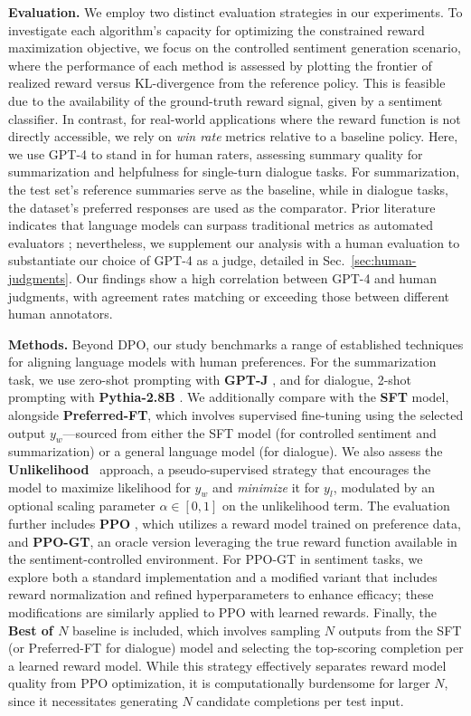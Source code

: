 \textbf{Evaluation.} We employ two distinct evaluation strategies in our experiments. To investigate each algorithm’s capacity for optimizing the constrained reward maximization objective, we focus on the controlled sentiment generation scenario, where the performance of each method is assessed by plotting the frontier of realized reward versus KL-divergence from the reference policy. This is feasible due to the availability of the ground-truth reward signal, given by a sentiment classifier. In contrast, for real-world applications where the reward function is not directly accessible, we rely on \textit{win rate} metrics relative to a baseline policy. Here, we use GPT-4 to stand in for human raters, assessing summary quality for summarization and helpfulness for single-turn dialogue tasks. For summarization, the test set’s reference summaries serve as the baseline, while in dialogue tasks, the dataset’s preferred responses are used as the comparator. Prior literature indicates that language models can surpass traditional metrics as automated evaluators \citep{Chen2023ExploringTU}; nevertheless, we supplement our analysis with a human evaluation to substantiate our choice of GPT-4 as a judge, detailed in Sec.~\ref{sec:human-judgments}. Our findings show a high correlation between GPT-4 and human judgments, with agreement rates matching or exceeding those between different human annotators.

\textbf{Methods.} Beyond DPO, our study benchmarks a range of established techniques for aligning language models with human preferences. For the summarization task, we use zero-shot prompting with \textbf{GPT-J} \citep{gpt-j}, and for dialogue, 2-shot prompting with \textbf{Pythia-2.8B} \citep{biderman2023pythia}. We additionally compare with the \textbf{SFT} model, alongside \textbf{Preferred-FT}, which involves supervised fine-tuning using the selected output $y_w$—sourced from either the SFT model (for controlled sentiment and summarization) or a general language model (for dialogue). We also assess the \textbf{Unlikelihood}~\citep{welleck2019neural} approach, a pseudo-supervised strategy that encourages the model to maximize likelihood for $y_w$ and \textit{minimize} it for $y_l$, modulated by an optional scaling parameter $\alpha\in[0,1]$ on the unlikelihood term. The evaluation further includes \textbf{PPO} \citep{schulman2017proximal}, which utilizes a reward model trained on preference data, and \textbf{PPO-GT}, an oracle version leveraging the true reward function available in the sentiment-controlled environment. For PPO-GT in sentiment tasks, we explore both a standard implementation \cite{leandro_von_werra_2023_7790115} and a modified variant that includes reward normalization and refined hyperparameters to enhance efficacy; these modifications are similarly applied to PPO with learned rewards. Finally, the \textbf{Best of $N$} baseline is included, which involves sampling $N$ outputs from the SFT (or Preferred-FT for dialogue) model and selecting the top-scoring completion per a learned reward model. While this strategy effectively separates reward model quality from PPO optimization, it is computationally burdensome for larger $N$, since it necessitates generating $N$ candidate completions per test input.

